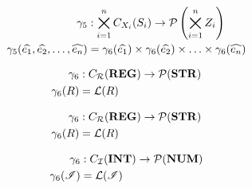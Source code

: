 \begin{align}
    \gamma_5 &: \bigtimes_{i = 1}^{n}C_{X_i}(S_i) \rightarrow \mathcal{P}\left(\bigtimes_{i = 1}^n Z_i \right) \\
    \gamma_5(\widehat{e_1}, \widehat{e_2}, \dots, \widehat{e_n}) &= \gamma_6(\widehat{e_1}) \times \gamma_6(\widehat{e_2}) \times \dots \times \gamma_6(\widehat{e_n})
\end{align}

\begin{align}
    \gamma_6 &: C_{\mathcal{R}}(\mathbf{REG}) \rightarrow \mathcal{P}(\mathbf{STR}) \\
    \gamma_6(R) &= \mathcal{L}(R)
\end{align}

\begin{align}
    \gamma_6 &: C_{\mathcal{R}}(\mathbf{REG}) \rightarrow \mathcal{P}(\mathbf{STR}) \\
    \gamma_6(R) &= \mathcal{L}(R)
\end{align}

\begin{align}
    \gamma_6 &: C_{\mathcal{\mathcal{I}}}(\mathbf{INT}) \rightarrow \mathcal{P}(\mathbf{NUM}) \\
    \gamma_6(\mathscr{I}) &= \mathcal{L}(\mathscr{I})
\end{align}


